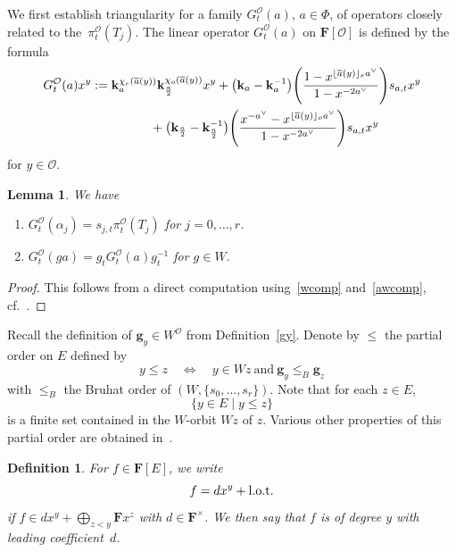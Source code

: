 \documentclass[pdftex]{sigma}
\numberwithin{equation}{section}
\newtheorem{Lemma}[Theorem]{Lemma}
\newtheorem{Definition}[Theorem]{Definition}
\begin{document}
We first establish triangularity for a family $G_{t}^\mathcal{O}(a)$, $a\in\Phi$, of operators
closely related to the~$\pi_{t}^\mathcal{O}(T_j)$.
The linear operator $G_{t}^\mathcal{O}(a)$ on $\mathbf{F}[\mathcal{O}]$ is defined by the formula
\begin{gather*}%
G_{t}^\mathcal{O}(a)x^y:=\mathbf{k}_a^{\chi_e(\overline{a}(y))}\mathbf{k}_{\frac{a}{2}}^{\chi_o(\overline{a}(y))}x^y +\bigl(\mathbf{k}_a-\mathbf{k}_a^{-1}\bigr)\Biggl(\frac{1-x^{\lfloor\overline{a}(y)\rfloor_e a^\vee}}{1-x^{-2a^\vee}}\Biggr)s_{a,t}x^y\\
\hphantom{G_{t}^\mathcal{O}(a)x^y:=}{}
+\bigl(\mathbf{k}_{\frac{a}{2}}-\mathbf{k}_{\frac{a}{2}}^{-1}\bigr)\Biggl(\frac{x^{-a^\vee}-x^{\lfloor \overline{a}(y)\rfloor_o a^\vee}}{1-x^{-2a^\vee}}\Biggr)
s_{a,t}x^y
\end{gather*}
for $y\in\mathcal{O}$.
\begin{Lemma}\label{elementaryG}
We have
\begin{enumerate}\itemsep=0pt
\item[$(1)$] $G_{t}^\mathcal{O}(\alpha_j)=s_{j,t}\pi_{t}^\mathcal{O}(T_j)$ for $j=0,\dots,r$.
\item[$(2)$] $G_{t}^\mathcal{O}(ga)=g_tG_t^\mathcal{O}(a)g_t^{-1}$ for $g\in W$.
\end{enumerate}
\end{Lemma}

\begin{proof}This follows from a direct computation using~\eqref{wcomp} and~\eqref{awcomp}, cf.~\cite[Section~5.5]{SSV2}.
\end{proof}

Recall the definition of $\mathbf{g}_y\in W^{\mathcal{O}}$ from Definition~\ref{gy}. Denote by $\leq$ the partial order on $E$ defined by
\[
y\leq z\quad\Leftrightarrow\quad y\in Wz \ \text{and}\ \mathbf{g}_y\leq_B\mathbf{g}_z
\]
with $\leq_B$ the Bruhat order of $(W,\{s_0,\dots,s_r\})$. Note that for each $z\in E$,
\[
\{y\in E \mid y\leq z\}
\]
is a finite set contained in the $W$-orbit $Wz$ of $z$. Various other properties of this partial order are obtained in~\cite[Section~5.4]{SSV2}.

\begin{Definition}
For $f\in\mathbf{F}[E]$, we write
\[
f=dx^y+ {\rm l.o.t.}
\]
if $f\in dx^y+\bigoplus_{z<y}\mathbf{F}x^z$ with $d\in\mathbf{F}^\times$. We then say that $f$ is of degree $y$ with leading coefficient~$d$.
\end{Definition}
\end{document}
